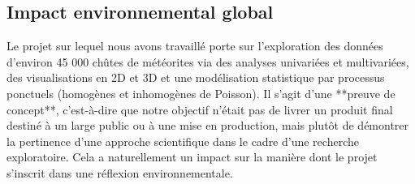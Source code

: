 \documentclass[12pt]{article}
\begin{document}
\subsection{Impact environnemental global}
Le projet sur lequel nous avons travaillé porte sur l’exploration des données d'environ 45 000 chûtes de météorites via des analyses univariées et multivariées, des visualisations en 2D et 3D et une modélisation statistique par processus ponctuels (homogènes et inhomogènes de Poisson). Il s’agit d’une **preuve de concept**, c’est-à-dire que notre objectif n’était pas de livrer un produit final destiné à un large public ou à une mise en production, mais plutôt de démontrer la pertinence d’une approche scientifique dans le cadre d’une recherche exploratoire. Cela a naturellement un impact sur la manière dont le projet s’inscrit dans une réflexion environnementale.
\end{document}
